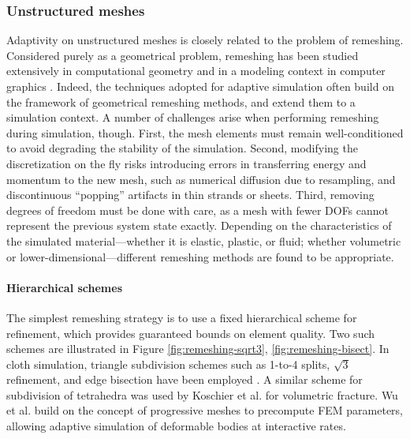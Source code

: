 \subsubsection{Unstructured meshes}
\label{sec:meshes}


Adaptivity on unstructured meshes is closely related to the problem of remeshing.
Considered purely as a geometrical problem, remeshing has been studied extensively in computational geometry \cite{Cheng2012} and in a modeling context in computer graphics \cite{Alliez2008}.
Indeed, the techniques adopted for adaptive simulation often build on the framework of geometrical remeshing methods, and extend them to a simulation context.
A number of challenges arise when performing remeshing during simulation, though.
First, the mesh elements must remain well-conditioned to avoid degrading the stability of the simulation.
Second, modifying the discretization on the fly risks introducing errors in transferring energy and momentum to the new mesh, such as numerical diffusion due to resampling, and discontinuous ``popping'' artifacts in thin strands or sheets.
Third, removing degrees of freedom must be done with care, as a mesh with fewer DOFs cannot represent the previous system state exactly.
Depending on the characteristics of the simulated material---whether it is elastic, plastic, or fluid; whether volumetric or lower-dimensional---different remeshing methods are found to be appropriate.


\paragraph*{Hierarchical schemes} The simplest remeshing strategy is to use a fixed hierarchical scheme for refinement, which provides guaranteed bounds on element quality.
Two such schemes are illustrated in Figure \ref{fig:remeshing-sqrt3}, \ref{fig:remeshing-bisect}.
In cloth simulation, triangle subdivision schemes such as 1-to-4 splits, $\sqrt3$ refinement, and edge bisection have been employed \cite{Li2005,Simnett2009,Bender2012}.
A similar scheme for subdivision of tetrahedra was used by Koschier et al. \cite{Koschier2014} for volumetric fracture.
Wu et al. \cite{Wu2001} build on the concept of progressive meshes \cite{Hoppe1996} to precompute FEM parameters, allowing adaptive simulation of deformable bodies at interactive rates.

